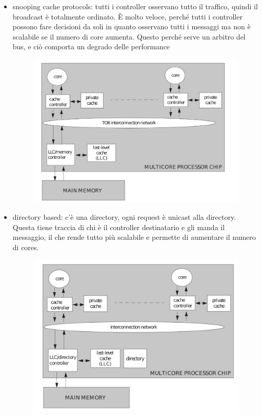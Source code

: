 \documentclass[12pt, oneside]{extbook} %
\begin{document}
\begin{itemize}
\item snooping cache protocols: tutti i controller osservano tutto il traffico, quindi il broadcast è totalmente ordinato. È molto veloce, perché tutti i controller possono fare decisioni da soli in quanto osservano tutti i messaggi ma non è scalabile se il numero di core aumenta. Questo perché serve un arbitro del bus, e ciò comporta un degrado delle performance\\
\begin{figure}[!h]
	\includegraphics[scale=0.3]{immagini/snooping.png}
\end{figure}
\item directory based: c'è una directory, ogni request è unicast alla directory. Questa tiene traccia di chi è il controller destinatario e gli manda il messaggio, il che rende tutto più scalabile e permette di aumentare il numero di cores.\\
\begin{figure}[!h]
	\includegraphics[scale=0.3]{immagini/directory.png}
\end{figure}
\end{itemize}
\end{document}
